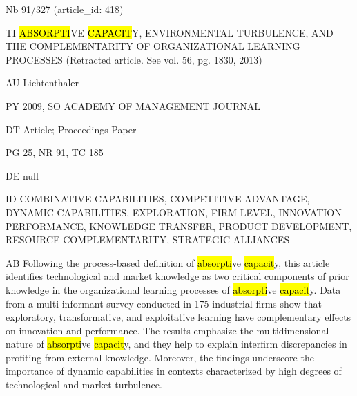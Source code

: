\documentclass[a4paper]{article}
\begin{document}
\vspace*{-2cm}
Nb \tabto{0cm}91/327 (article\_id: 418)\par
TI \tabto{0cm}\hl{ABSORPTI}VE \hl{CAPACIT}Y, ENVIRONMENTAL TURBULENCE, AND THE COMPLEMENTARITY OF ORGANIZATIONAL LEARNING PROCESSES (Retracted article. See vol. 56, pg. 1830, 2013)\par
AU \tabto{0cm}Lichtenthaler\par
PY \tabto{0cm}2009, SO ACADEMY OF MANAGEMENT JOURNAL\par
DT \tabto{0cm}Article; Proceedings Paper\par
PG \tabto{0cm}25, NR 91, TC 185\par
DE \tabto{0cm}null\par
ID \tabto{0cm}COMBINATIVE CAPABILITIES, COMPETITIVE ADVANTAGE, DYNAMIC CAPABILITIES, EXPLORATION, FIRM-LEVEL, INNOVATION PERFORMANCE, KNOWLEDGE TRANSFER, PRODUCT DEVELOPMENT, RESOURCE COMPLEMENTARITY, STRATEGIC ALLIANCES\par
AB \tabto{0cm}Following the process-based definition of \hl{absorpti}ve \hl{capacit}y, this article identifies technological and market knowledge as two critical components of prior knowledge in the organizational learning processes of \hl{absorpti}ve \hl{capacit}y. Data from a multi-informant survey conducted in 175 industrial firms show that exploratory, transformative, and exploitative learning have complementary effects on innovation and performance. The results emphasize the multidimensional nature of \hl{absorpti}ve \hl{capacit}y, and they help to explain interfirm discrepancies in profiting from external knowledge. Moreover, the findings underscore the importance of dynamic capabilities in contexts characterized by high degrees of technological and market turbulence.\par
\clearpage
\end{document}
